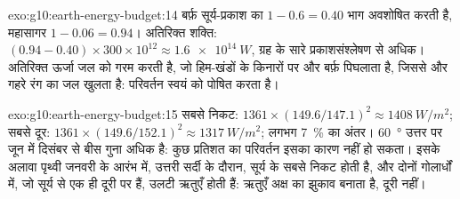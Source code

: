 \begin{solution}{exo:g10:earth-energy-budget:14}
बर्फ़ सूर्य-प्रकाश का $1 - 0.6 = 0.40$ भाग अवशोषित करती है, महासागर $1 - 0.06 =
0.94$। अतिरिक्त शक्ति: $(0.94 - 0.40) \times 300 \times 10^{12} \approx
\qty{1.6e14}{W}$, ग्रह के सारे प्रकाशसंश्लेषण से अधिक। अतिरिक्त
ऊर्जा जल को गरम करती है, जो हिम-खंडों के किनारों पर और बर्फ़ पिघलाता है,
जिससे और गहरे रंग का जल खुलता है: परिवर्तन स्वयं को पोषित करता है।
\end{solution}

\begin{solution}{exo:g10:earth-energy-budget:15}
सबसे निकट: $1361 \times (149.6/147.1)^2 \approx \qty{1408}{W/m^2}$; सबसे दूर:
$1361 \times (149.6/152.1)^2 \approx \qty{1317}{W/m^2}$; लगभग
\qty{7}{\percent} का अंतर। \qty{60}{\degree} उत्तर पर  जून में दिसंबर से बीस
गुना अधिक है: कुछ प्रतिशत का परिवर्तन इसका कारण नहीं हो सकता। इसके अलावा पृथ्वी जनवरी
के आरंभ में, उत्तरी सर्दी के दौरान, सूर्य के सबसे निकट होती है, और दोनों गोलार्धों में, जो
सूर्य से एक ही दूरी पर हैं, उलटी ऋतुएँ होती हैं: ऋतुएँ अक्ष का झुकाव बनाता है, दूरी
नहीं।
\end{solution}

